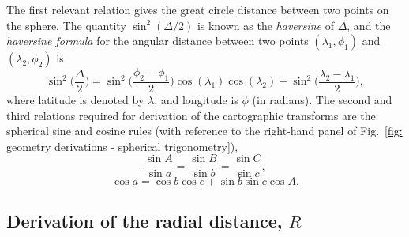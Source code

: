 The first relevant relation gives the great circle distance between two points on the sphere. The quantity $\sin^2(\Delta/2)$ is known as the \textit{haversine} of $\Delta$, and the \textit{haversine formula} for the angular distance between two points $(\lambda_1, \phi_1)$ and $(\lambda_2, \phi_2)$ is
\begin{equation}
    \label{eq: geometry derivations - haversine}
	\sin^2\bigg(\frac{\Delta}{2}\bigg) = \sin^2\bigg(\frac{\phi_2 - \phi_1}{2}\bigg) \cos(\lambda_1)\cos(\lambda_2) + \sin^2\bigg(\frac{\lambda_2 - \lambda_1}{2}\bigg),
\end{equation}
where latitude is denoted by $\lambda$, and longitude is $\phi$ (in radians). The second and third relations required for derivation of the cartographic transforms are the spherical sine and cosine rules (with reference to the right-hand panel of Fig.~\ref{fig: geometry derivations - spherical trigonometry}),
\begin{equation}
    \label{eq: geometry derivations - spherical sine}
    \frac{\sin A}{\sin a} = \frac{\sin B}{\sin b} = \frac{\sin C}{\sin c},
\end{equation}
\begin{equation}
    \label{eq: geometry derivations - spherical cosine}
    \cos a = \cos b \cos c + \sin b \sin c \cos A. 
\end{equation}



















\subsection{Derivation of the radial distance, \texorpdfstring{$R$}{\textit{R}}}
\label{app: geometry derivations - cartographic transforms - derivation of R}

